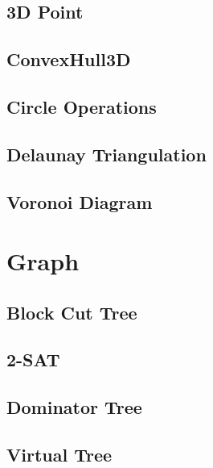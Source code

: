 \documentclass{article}
\begin{document}
\subsection{3D Point}


\subsection{ConvexHull3D}


\subsection{Circle Operations}


\subsection{Delaunay Triangulation}


\subsection{Voronoi Diagram}


\section{Graph}

\subsection{Block Cut Tree}


\subsection{2-SAT}


\subsection{Dominator Tree}


\subsection{Virtual Tree}

\end{document}
